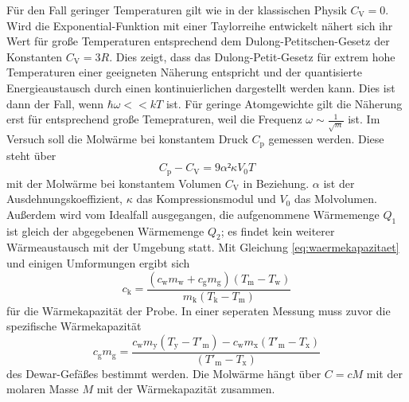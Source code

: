 Für den Fall geringer Temperaturen gilt wie in der klassischen Physik $C_\mathup{V}=0$. Wird die Exponential-Funktion mit einer Taylorreihe entwickelt nähert sich ihr Wert für große Temperaturen entsprechend dem Dulong-Petitschen-Gesetz der Konstanten $C_\mathup{V}=3R$.
Dies zeigt, dass das Dulong-Petit-Gesetz für extrem hohe Temperaturen einer geeigneten Näherung entspricht und der quantisierte Energieaustausch durch einen kontinuierlichen dargestellt werden kann. Dies ist dann der Fall, wenn $\hbar\omega<<kT$ ist. 
Für geringe Atomgewichte gilt die Näherung erst für entsprechend große Temepraturen, weil die Frequenz $\omega\sim \frac{1}{\sqrt{m}}$ ist.
Im Versuch soll die Molwärme bei konstantem Druck $C_\mathup{p}$ gemessen werden. Diese steht über
\begin{equation}
C_\mathup{p}-C_\mathup{V}=9{\alpha}²\kappa V_0 T
\label{alphakappalpha}
\end{equation}
mit der Molwärme bei konstantem Volumen $C_\mathup{V}$ in Beziehung. $\alpha$ ist der Ausdehnungskoeffizient, $\kappa$ das Kompressionsmodul und $V_0$ das Molvolumen.
Außerdem wird vom Idealfall ausgegangen, die aufgenommene Wärmemenge $Q_1$ ist gleich der abgegebenen Wärmemenge $Q_2$; es findet kein weiterer Wärmeaustausch mit der Umgebung statt.
Mit Gleichung \eqref{eq:waermekapazitaet} und einigen Umformungen ergibt sich
\begin{equation}
c_\mathup{k}=\frac{(c_\mathup{w}m_\mathup{w}+c_\mathup{g}m_\mathup{g})(T_\mathup{m}-T_\mathup{w})}{m_\mathup{k}(T_\mathup{k}-T_\mathup{m})}
\label{c_Probe}
\end{equation}
für die Wärmekapazität der Probe. 
In einer seperaten Messung muss zuvor die spezifische Wärmekapazität 
\begin{equation}
c_\mathup{g}m_\mathup{g}=\frac{c_\mathup{w}m_\mathup{y}(T_\mathup{y}-T'_\mathup{m})-c_\mathup{w}m_\mathup{x}(T'_\mathup{m}-T_\mathup{x})}{(T'_\mathup{m}-T_\mathup{x})}
\label{c_Dewar}
\end{equation}
des Dewar-Gefäßes bestimmt werden. 
Die Molwärme hängt über $C=cM$ mit der molaren Masse $M$ mit der Wärmekapazität zusammen.


